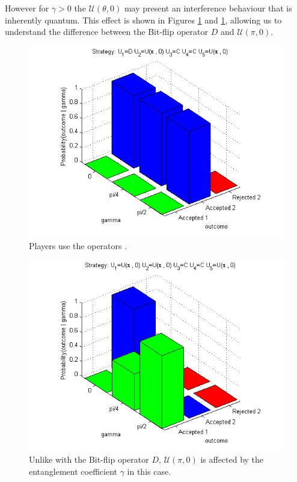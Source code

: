 \documentclass[10pt,twocolumn]{llncs}
\begin{document}
However for $\gamma >0$ the $\mathcal{U} ( \theta , 0)$ may present an interference behaviour that is inherently quantum. This effect is shown in Figures \ref{fig:pg_3players_99_0_1:2} and \ref{fig:pg_3players_99_0_1:2}, allowing us to understand the difference between the Bit-flip operator $D$ and $\mathcal{U} ( \pi , 0)$.



\begin{figure}[!h]
\centering 
\includegraphics[scale=0.80]{Figures/1.5qubit/DUpi0CCUpi0.png}
\caption{Players use the operators . }
\label{fig:pg_3players_99_0_1:2}
\end{figure}

\begin{figure}[h!]
\centering 
\includegraphics[scale=0.80]{Figures/1.5qubit/Upi0Upi0CCUpi0.png}
\caption{Unlike with the Bit-flip operator $D$, $\mathcal{U} (\pi, 0)$ is affected by the entanglement coefficient $\gamma$ in this case. }
\label{fig:pg_3players_99_0_1:3}
\end{figure}
\end{document}
